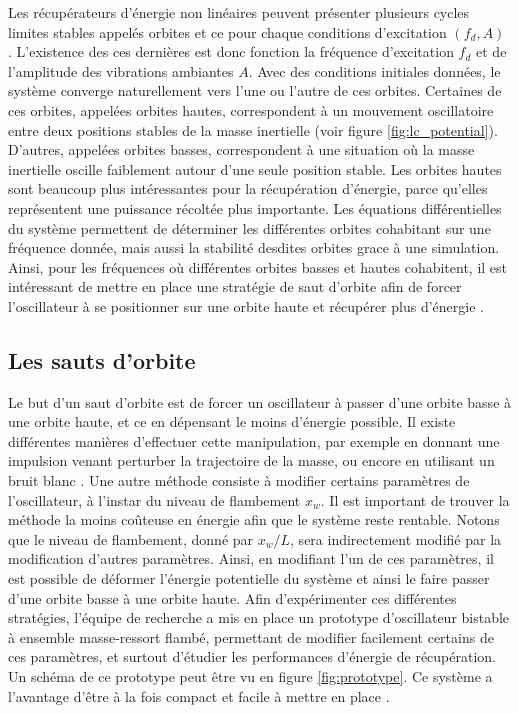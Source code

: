 \documentclass[a4paper, french, 12pt, titlepage]{article}
\begin{document}
\noindent Les récupérateurs d'énergie non linéaires peuvent présenter plusieurs cycles limites stables appelés orbites et ce pour chaque conditions d'excitation $(f_d, A)$ .
L'existence des ces dernières est donc fonction la fréquence d'excitation $f_d$ et de l'amplitude des vibrations ambiantes $A$.
Avec des conditions initiales données, le système converge naturellement vers l'une ou l'autre de ces orbites.
Certaines de ces orbites, appelées orbites hautes, correspondent à un mouvement oscillatoire entre deux positions stables de la masse inertielle (voir figure \ref{fig:lc_potential}).
D'autres, appelées orbites basses, correspondent à une situation où la masse inertielle oscille faiblement autour d'une seule position stable.
Les orbites hautes sont beaucoup plus intéressantes pour la récupération d'énergie, parce qu'elles représentent une puissance récoltée plus importante.
Les équations différentielles du système permettent de déterminer les différentes orbites cohabitant sur une fréquence donnée, mais aussi la stabilité desdites orbites grace à une simulation.
Ainsi, pour les fréquences où différentes orbites basses et hautes cohabitent, il est intéressant de mettre en place une stratégie de saut d'orbite afin de forcer l'oscillateur à se positionner sur une orbite haute et récupérer plus d'énergie \cite{saint2022power}.






\subsection{Les sauts d'orbite}

Le but d'un saut d'orbite est de forcer un oscillateur à passer d'une orbite basse à une orbite haute, et ce en dépensant le moins d'énergie possible.
Il existe différentes manières d'effectuer cette manipulation, par exemple en donnant une impulsion venant perturber la trajectoire de la masse, ou encore en utilisant un bruit blanc \cite{huguet2018phd}.
Une autre méthode consiste à modifier certains paramètres de l'oscillateur, à l'instar du niveau de flambement $x_w$.
Il est important de trouver la méthode la moins coûteuse en énergie afin que le système reste rentable.
Notons que le niveau de flambement, donné par $x_w/ L$, sera indirectement modifié par la modification d'autres paramètres.
Ainsi, en modifiant l'un de ces paramètres, il est possible de déformer l'énergie potentielle du système et ainsi le faire passer d'une orbite basse à une orbite haute.
Afin d'expérimenter ces différentes stratégies, l'équipe de recherche a mis en place un prototype d'oscillateur bistable à ensemble masse-ressort flambé, permettant de modifier facilement certains de ces paramètres, et surtout d'étudier les performances d'énergie de récupération.
Un schéma de ce prototype peut être vu en figure \ref{fig:prototype}.
Ce système a l'avantage d'être à la fois compact et facile à mettre en place \cite{Liu2014}.
\end{document}
